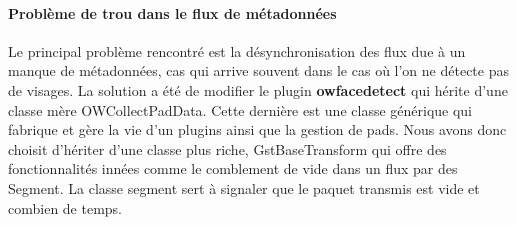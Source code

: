 \paragraph{Problème de trou dans le flux de métadonnées}
Le principal problème rencontré est la désynchronisation des flux due à un manque de métadonnées, cas qui arrive souvent dans le cas où l'on ne détecte pas de visages. La solution a été de modifier le plugin \textbf{owfacedetect} qui hérite d'une classe mère OWCollectPadData. Cette dernière est une classe générique qui fabrique et gère la vie d'un plugins ainsi que la gestion de pads. Nous avons donc choisit d'hériter d'une classe plus riche, GstBaseTransform qui offre des fonctionnalités innées comme le comblement de vide dans un flux par des Segment. La classe segment sert à signaler que le paquet transmis est vide et combien de temps.